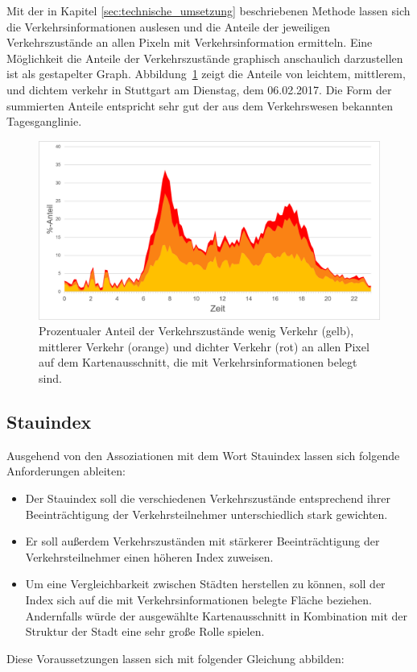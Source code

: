 Mit der in Kapitel \ref{sec:technische_umsetzung} beschriebenen Methode lassen sich die Verkehrsinformationen auslesen und die Anteile der jeweiligen Verkehrszustände an allen Pixeln mit Verkehrsinformation ermitteln.
Eine Möglichkeit die Anteile der Verkehrszustände graphisch anschaulich darzustellen ist als gestapelter Graph.
Abbildung~\ref{fig:stacked_stuttgart} zeigt die Anteile von leichtem, mittlerem, und dichtem verkehr in Stuttgart am Dienstag, dem 06.02.2017. Die Form der summierten Anteile entspricht sehr gut der aus dem Verkehrswesen bekannten Tagesganglinie. 
\begin{figure}
  \centering
    \includegraphics[width=1.0\textwidth]{images/stacked_stuttgart.png}
    \caption{Prozentualer Anteil der Verkehrszustände wenig Verkehr (gelb), mittlerer Verkehr (orange) und dichter Verkehr (rot) an allen Pixel auf dem Kartenausschnitt, die mit Verkehrsinformationen belegt sind.}
    \label{fig:stacked_stuttgart}
\end{figure}

\newpage
\subsection{Stauindex}

Ausgehend von den Assoziationen mit dem Wort Stauindex lassen sich folgende Anforderungen ableiten:
\begin{itemize}
\item Der Stauindex soll die verschiedenen Verkehrszustände entsprechend ihrer Beeinträchtigung der Verkehrsteilnehmer unterschiedlich stark gewichten.
\item Er soll außerdem Verkehrszuständen mit stärkerer Beeinträchtigung der Verkehrsteilnehmer einen höheren Index zuweisen.
\item Um eine Vergleichbarkeit zwischen Städten  herstellen zu können, soll der Index sich auf die mit Verkehrsinformationen belegte Fläche beziehen. Andernfalls würde der ausgewählte Kartenausschnitt in Kombination mit der Struktur der Stadt eine sehr große Rolle spielen. 
\end{itemize}
Diese Voraussetzungen lassen sich mit folgender Gleichung abbilden:

